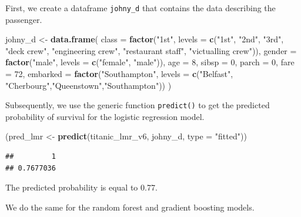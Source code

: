 \documentclass[]{krantz}
\newenvironment{Shaded}{\begin{snugshade}}{\end{snugshade}}
\newcommand{\DataTypeTok}[1]{\textcolor[rgb]{0.13,0.29,0.53}{#1}}
\newcommand{\DecValTok}[1]{\textcolor[rgb]{0.00,0.00,0.81}{#1}}
\newcommand{\KeywordTok}[1]{\textcolor[rgb]{0.13,0.29,0.53}{\textbf{#1}}}
\newcommand{\NormalTok}[1]{#1}
\newcommand{\StringTok}[1]{\textcolor[rgb]{0.31,0.60,0.02}{#1}}
\begin{document}
First, we create a dataframe \texttt{johny\_d} that contains the data describing the passenger.

\begin{Shaded}
\begin{Highlighting}[]
\NormalTok{johny_d <-}\StringTok{ }\KeywordTok{data.frame}\NormalTok{(}
            \DataTypeTok{class =} \KeywordTok{factor}\NormalTok{(}\StringTok{"1st"}\NormalTok{, }\DataTypeTok{levels =} \KeywordTok{c}\NormalTok{(}\StringTok{"1st"}\NormalTok{, }\StringTok{"2nd"}\NormalTok{, }\StringTok{"3rd"}\NormalTok{, }\StringTok{"deck crew"}\NormalTok{,}
                        \StringTok{"engineering crew"}\NormalTok{, }\StringTok{"restaurant staff"}\NormalTok{, }\StringTok{"victualling crew"}\NormalTok{)),}
            \DataTypeTok{gender =} \KeywordTok{factor}\NormalTok{(}\StringTok{"male"}\NormalTok{, }\DataTypeTok{levels =} \KeywordTok{c}\NormalTok{(}\StringTok{"female"}\NormalTok{, }\StringTok{"male"}\NormalTok{)),}
            \DataTypeTok{age =} \DecValTok{8}\NormalTok{,}
            \DataTypeTok{sibsp =} \DecValTok{0}\NormalTok{,}
            \DataTypeTok{parch =} \DecValTok{0}\NormalTok{,}
            \DataTypeTok{fare =} \DecValTok{72}\NormalTok{,}
            \DataTypeTok{embarked =} \KeywordTok{factor}\NormalTok{(}\StringTok{"Southampton"}\NormalTok{, }\DataTypeTok{levels =} \KeywordTok{c}\NormalTok{(}\StringTok{"Belfast"}\NormalTok{,}
                        \StringTok{"Cherbourg"}\NormalTok{,}\StringTok{"Queenstown"}\NormalTok{,}\StringTok{"Southampton"}\NormalTok{))}
\NormalTok{)}
\end{Highlighting}
\end{Shaded}

Subsequently, we use the generic function \texttt{predict()} to get the predicted probability of survival for the logistic regression model.

\begin{Shaded}
\begin{Highlighting}[]
\NormalTok{(pred_lmr <-}\StringTok{ }\KeywordTok{predict}\NormalTok{(titanic_lmr_v6, johny_d, }\DataTypeTok{type =} \StringTok{"fitted"}\NormalTok{))}
\end{Highlighting}
\end{Shaded}

\begin{verbatim}
##         1 
## 0.7677036
\end{verbatim}

The predicted probability is equal to 0.77.

We do the same for the random forest and gradient boosting models.
\end{document}
